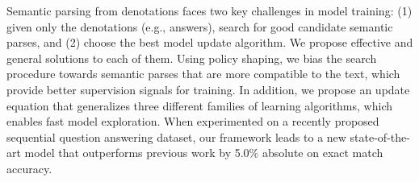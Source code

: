 Semantic parsing from denotations faces two key challenges in model training: (1) given only the denotations (e.g., answers), search for good candidate semantic parses, and (2) choose the best model update algorithm. We propose effective and general solutions to each of them. Using policy shaping, we bias the search procedure towards semantic parses that are more compatible to the text, which provide better supervision signals for training. In addition, we propose an update equation that generalizes three different families of learning algorithms, which enables fast model exploration. When experimented on a recently proposed sequential question answering dataset, our framework leads to a new state-of-the-art model that outperforms previous work by 5.0\% absolute on exact match accuracy.
